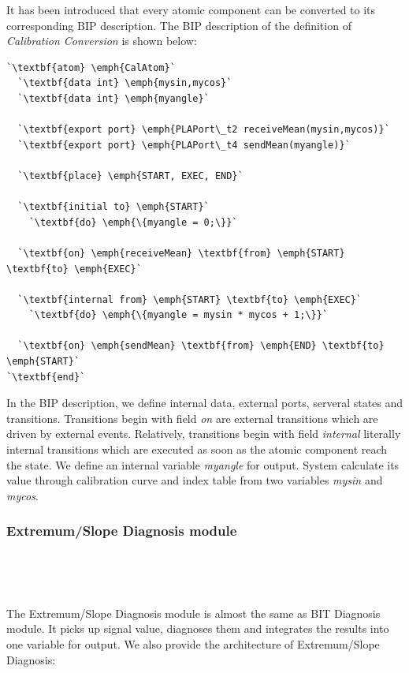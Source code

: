 It has been introduced that every atomic component can be converted to its corresponding BIP description. The BIP description of the definition of \emph{Calibration Conversion} is shown below:

\begin{lstlisting}
`\textbf{atom} \emph{CalAtom}`
  `\textbf{data int} \emph{mysin,mycos}`
  `\textbf{data int} \emph{myangle}`

  `\textbf{export port} \emph{PLAPort\_t2 receiveMean(mysin,mycos)}`
  `\textbf{export port} \emph{PLAPort\_t4 sendMean(myangle)}`

  `\textbf{place} \emph{START, EXEC, END}`

  `\textbf{initial to} \emph{START}`
    `\textbf{do} \emph{\{myangle = 0;\}}`

  `\textbf{on} \emph{receiveMean} \textbf{from} \emph{START} \textbf{to} \emph{EXEC}`

  `\textbf{internal from} \emph{START} \textbf{to} \emph{EXEC}`
    `\textbf{do} \emph{\{myangle = mysin * mycos + 1;\}}`

  `\textbf{on} \emph{sendMean} \textbf{from} \emph{END} \textbf{to} \emph{START}`
`\textbf{end}`
\end{lstlisting}

In the BIP description, we define internal data, external ports, serveral states and transitions. Transitions begin with field \emph{on} are external transitions which are driven by external events. Relatively, transitions begin with field \emph{internal} literally internal transitions which are executed as soon as the atomic component reach the state. We define an internal variable \emph{myangle} for output. System calculate its value through calibration curve and index table from two variables \emph{mysin} and \emph{mycos}.

\subsubsection{Extremum/Slope Diagnosis module}

\

\

\noindent The Extremum/Slope Diagnosis module is almost the same as BIT Diagnosis module. It picks up signal value, diagnoses them and integrates the results into one variable for output. We also provide the architecture of Extremum/Slope Diagnosis:

